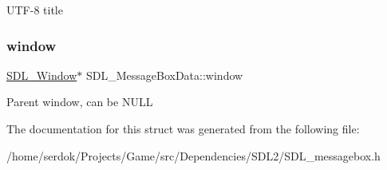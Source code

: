 U\+T\+F-\/8 title \mbox{\label{structSDL__MessageBoxData_a5c333bc93705c66068e140bc28daedcb}} 
\subsubsection{\texorpdfstring{window}{window}}
{\footnotesize\ttfamily \hyperlink{SDL__video_8h_a55a196c7d3b8497538632c79ae1e6392}{S\+D\+L\+\_\+\+Window}$\ast$ S\+D\+L\+\_\+\+Message\+Box\+Data\+::window}

Parent window, can be N\+U\+LL 

The documentation for this struct was generated from the following file\+:\begin{DoxyCompactItemize}
\item 
/home/serdok/\+Projects/\+Game/src/\+Dependencies/\+S\+D\+L2/S\+D\+L\+\_\+messagebox.\+h\end{DoxyCompactItemize}
